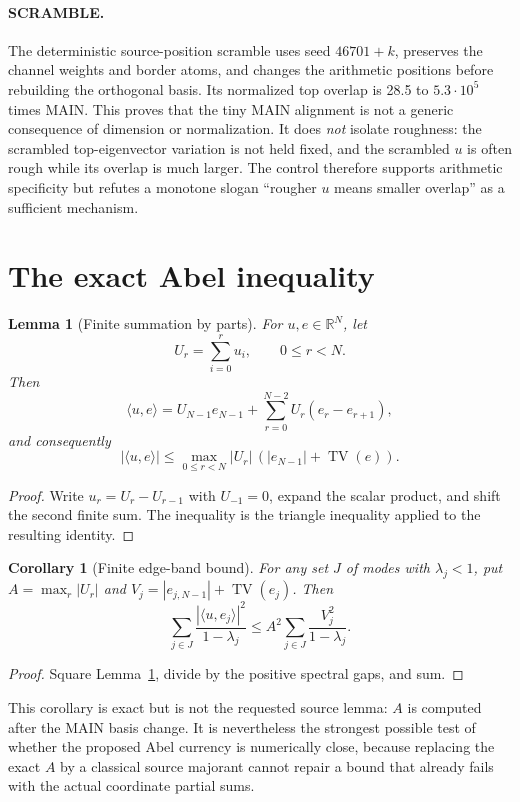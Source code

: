\documentclass[11pt]{article}
\newtheorem{lemma}{Lemma}
\newtheorem{corollary}{Corollary}
\theoremstyle{remark}
\newcommand{\TV}{\operatorname{TV}}
\begin{document}
\paragraph{SCRAMBLE.}
The deterministic source-position scramble uses seed $46701+k$, preserves
the channel weights and border atoms, and changes the arithmetic
positions before rebuilding the orthogonal basis.  Its normalized top
overlap is 28.5 to $5.3\cdot10^5$ times MAIN.  This proves that the tiny
MAIN alignment is not a generic consequence of dimension or normalization.
It does \emph{not} isolate roughness: the scrambled top-eigenvector
variation is not held fixed, and the scrambled $u$ is often rough while
its overlap is much larger.  The control therefore supports arithmetic
specificity but refutes a monotone slogan ``rougher $u$ means smaller
overlap'' as a sufficient mechanism.

\section{The exact Abel inequality}

\begin{lemma}[Finite summation by parts]\label{lem:abel}
For $u,e\in\mathbb R^N$, let
\[
 U_r=\sum_{i=0}^{r}u_i,\qquad 0\le r<N.
\]
Then
\[
 \langle u,e\rangle
 =U_{N-1}e_{N-1}
  +\sum_{r=0}^{N-2}U_r(e_r-e_{r+1}),
\]
and consequently
\[
 |\langle u,e\rangle|
 \le \max_{0\le r<N}|U_r|\,
 \left(|e_{N-1}|+\TV(e)\right).
\]
\end{lemma}

\begin{proof}
Write $u_r=U_r-U_{r-1}$ with $U_{-1}=0$, expand the scalar
product, and shift the second finite sum.  The inequality is the triangle
inequality applied to the resulting identity.
\end{proof}

\begin{corollary}[Finite edge-band bound]\label{cor:band}
For any set $J$ of modes with $\lambda_j<1$, put
$A=\max_r|U_r|$ and
$V_j=|e_{j,N-1}|+\TV(e_j)$.  Then
\[
 \sum_{j\in J}
 \frac{|\langle u,e_j\rangle|^2}{1-\lambda_j}
 \le A^2\sum_{j\in J}\frac{V_j^2}{1-\lambda_j}.
\]
\end{corollary}

\begin{proof}
Square Lemma~\ref{lem:abel}, divide by the positive spectral gaps,
and sum.
\end{proof}

This corollary is exact but is not the requested source lemma: $A$ is
computed after the MAIN basis change.  It is nevertheless the strongest
possible test of whether the proposed Abel currency is numerically close,
because replacing the exact $A$ by a classical source majorant cannot
repair a bound that already fails with the actual coordinate partial sums.
\end{document}
